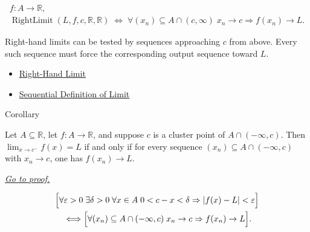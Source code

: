 \begin{remark*}
\[
\begin{aligned}
  f\colon A\to\mathbb{R},\\
  \operatorname{RightLimit}(L,f,c,\mathbb{R},\mathbb{R})
  \;\Longleftrightarrow\;
  \forall (x_n)\subseteq A\cap(c,\infty)\;
  x_n\to c\Rightarrow f(x_n)\to L.
\end{aligned}
\]
\end{remark*}

\begin{remark*}[Interpretation]
Right-hand limits can be tested by sequences approaching $c$ from above.
Every such sequence must force the corresponding output sequence toward
$L$.
\end{remark*}

\begin{dependencies}
\begin{itemize}
  \item \hyperref[def:right-hand-limit]{Right-Hand Limit}
  \item \hyperref[def:limit-function-sequential]{Sequential Definition of Limit}
\end{itemize}
\end{dependencies}


\begin{corollarybox}{Corollary}
\begin{corollary}
\label{cor:sequential-criterion-left-hand-limit}
Let $A\subseteq\mathbb{R}$, let $f:A\to\mathbb{R}$, and suppose $c$ is a
cluster point of $A\cap(-\infty,c)$. Then $\lim_{x\to c^-}f(x)=L$ if and
only if for every sequence $(x_n)\subseteq A\cap(-\infty,c)$ with
$x_n\to c$, one has $f(x_n)\to L$.

\smallskip\noindent
\hyperref[prf:sequential-criterion-left-hand-limit]{\textit{Go to proof.}}
\end{corollary}
\end{corollarybox}

\begin{remark*}
\[
\begin{aligned}
&\Bigl[\forall\varepsilon>0\;\exists\delta>0\;\forall x\in A\;
  0<c-x<\delta\Rightarrow |f(x)-L|<\varepsilon\Bigr] \\
&\quad\Longleftrightarrow
\Bigl[\forall (x_n)\subseteq A\cap(-\infty,c)\;
  x_n\to c\Rightarrow f(x_n)\to L\Bigr].
\end{aligned}
\]
\end{remark*}

